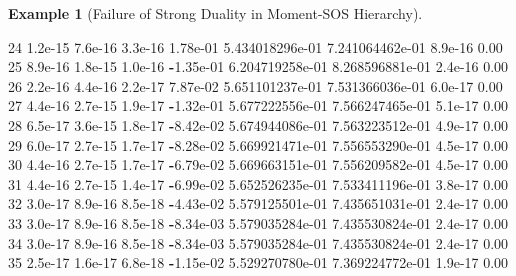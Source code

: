 \documentclass[
]{book}
\newenvironment{Shaded}{\begin{snugshade}}{\end{snugshade}}
\newcommand{\FloatTok}[1]{\textcolor[rgb]{0.00,0.00,0.81}{#1}}
\newcommand{\OperatorTok}[1]{\textcolor[rgb]{0.81,0.36,0.00}{\textbf{#1}}}
\theoremstyle{definition}
\theoremstyle{definition}
\newtheorem{example}{Example}[chapter]
\theoremstyle{definition}
\theoremstyle{definition}
\theoremstyle{remark}
\begin{document}
\begin{example}[Failure of Strong Duality in Moment-SOS Hierarchy]
\begin{Shaded}
\begin{Highlighting}[]
\FloatTok{24}  \FloatTok{1.2e{-}15}  \FloatTok{7.6e{-}16}  \FloatTok{3.3e{-}16}  \FloatTok{1.78e{-}01}   \FloatTok{5.434018296e{-}01}   \FloatTok{7.241064462e{-}01}   \FloatTok{8.9e{-}16}  \FloatTok{0.00}  
\FloatTok{25}  \FloatTok{8.9e{-}16}  \FloatTok{1.8e{-}15}  \FloatTok{1.0e{-}16}  \OperatorTok{{-}}\FloatTok{1.35e{-}01}  \FloatTok{6.204719258e{-}01}   \FloatTok{8.268596881e{-}01}   \FloatTok{2.4e{-}16}  \FloatTok{0.00}  
\FloatTok{26}  \FloatTok{2.2e{-}16}  \FloatTok{4.4e{-}16}  \FloatTok{2.2e{-}17}  \FloatTok{7.87e{-}02}   \FloatTok{5.651101237e{-}01}   \FloatTok{7.531366036e{-}01}   \FloatTok{6.0e{-}17}  \FloatTok{0.00}  
\FloatTok{27}  \FloatTok{4.4e{-}16}  \FloatTok{2.7e{-}15}  \FloatTok{1.9e{-}17}  \OperatorTok{{-}}\FloatTok{1.32e{-}01}  \FloatTok{5.677222556e{-}01}   \FloatTok{7.566247465e{-}01}   \FloatTok{5.1e{-}17}  \FloatTok{0.00}  
\FloatTok{28}  \FloatTok{6.5e{-}17}  \FloatTok{3.6e{-}15}  \FloatTok{1.8e{-}17}  \OperatorTok{{-}}\FloatTok{8.42e{-}02}  \FloatTok{5.674944086e{-}01}   \FloatTok{7.563223512e{-}01}   \FloatTok{4.9e{-}17}  \FloatTok{0.00}  
\FloatTok{29}  \FloatTok{6.0e{-}17}  \FloatTok{2.7e{-}15}  \FloatTok{1.7e{-}17}  \OperatorTok{{-}}\FloatTok{8.28e{-}02}  \FloatTok{5.669921471e{-}01}   \FloatTok{7.556553290e{-}01}   \FloatTok{4.5e{-}17}  \FloatTok{0.00}  
\FloatTok{30}  \FloatTok{4.4e{-}16}  \FloatTok{2.7e{-}15}  \FloatTok{1.7e{-}17}  \OperatorTok{{-}}\FloatTok{6.79e{-}02}  \FloatTok{5.669663151e{-}01}   \FloatTok{7.556209582e{-}01}   \FloatTok{4.5e{-}17}  \FloatTok{0.00}  
\FloatTok{31}  \FloatTok{4.4e{-}16}  \FloatTok{2.7e{-}15}  \FloatTok{1.4e{-}17}  \OperatorTok{{-}}\FloatTok{6.99e{-}02}  \FloatTok{5.652526235e{-}01}   \FloatTok{7.533411196e{-}01}   \FloatTok{3.8e{-}17}  \FloatTok{0.00}  
\FloatTok{32}  \FloatTok{3.0e{-}17}  \FloatTok{8.9e{-}16}  \FloatTok{8.5e{-}18}  \OperatorTok{{-}}\FloatTok{4.43e{-}02}  \FloatTok{5.579125501e{-}01}   \FloatTok{7.435651031e{-}01}   \FloatTok{2.4e{-}17}  \FloatTok{0.00}  
\FloatTok{33}  \FloatTok{3.0e{-}17}  \FloatTok{8.9e{-}16}  \FloatTok{8.5e{-}18}  \OperatorTok{{-}}\FloatTok{8.34e{-}03}  \FloatTok{5.579035284e{-}01}   \FloatTok{7.435530824e{-}01}   \FloatTok{2.4e{-}17}  \FloatTok{0.00}  
\FloatTok{34}  \FloatTok{3.0e{-}17}  \FloatTok{8.9e{-}16}  \FloatTok{8.5e{-}18}  \OperatorTok{{-}}\FloatTok{8.34e{-}03}  \FloatTok{5.579035284e{-}01}   \FloatTok{7.435530824e{-}01}   \FloatTok{2.4e{-}17}  \FloatTok{0.00}  
\FloatTok{35}  \FloatTok{2.5e{-}17}  \FloatTok{1.6e{-}17}  \FloatTok{6.8e{-}18}  \OperatorTok{{-}}\FloatTok{1.15e{-}02}  \FloatTok{5.529270780e{-}01}   \FloatTok{7.369224772e{-}01}   \FloatTok{1.9e{-}17}  \FloatTok{0.00}  

\end{Highlighting}
\end{Shaded}
\end{example}
\end{document}
